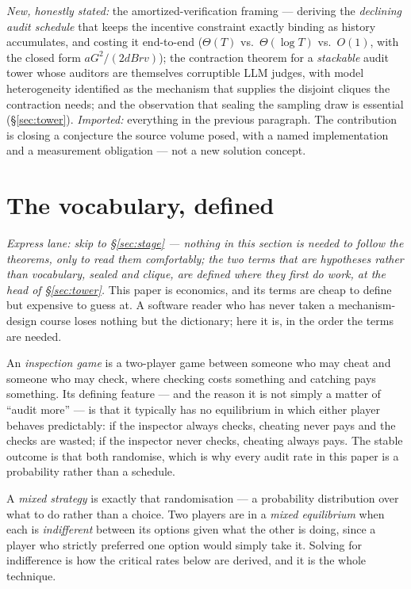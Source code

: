 \documentclass[11pt,a4paper]{article}
\begin{document}
\emph{New, honestly stated:} the amortized-verification framing --- deriving the \emph{declining audit schedule} that keeps the incentive constraint exactly binding as history accumulates, and costing it end-to-end ($\Theta(T)$ vs.\ $\Theta(\log T)$ vs.\ $O(1)$, with the closed form $aG^2/(2dBrv)$); the contraction theorem for a \emph{stackable} audit tower whose auditors are themselves corruptible LLM judges, with model heterogeneity identified as the mechanism that supplies the disjoint cliques the contraction needs; and the observation that sealing the sampling draw is essential (\S\ref{sec:tower}). \emph{Imported:} everything in the previous paragraph. The contribution is closing a conjecture the source volume posed, with a named implementation and a measurement obligation --- not a new solution concept.

\section{The vocabulary, defined}\label{sec:vocab}

\emph{Express lane: skip to \S\ref{sec:stage} --- nothing in this section is needed to follow the theorems, only to read them comfortably; the two terms that are hypotheses rather than vocabulary, \emph{sealed} and \emph{clique}, are defined where they first do work, at the head of \S\ref{sec:tower}.} This paper
is economics, and its terms are cheap to define but expensive to guess at. A software reader who has never taken
a mechanism-design course loses nothing but the dictionary; here it is, in the order the terms are needed.

An \emph{inspection game} is a two-player game between someone who may cheat and someone who may check, where checking
costs something and catching pays something. Its defining feature --- and the reason it is not simply a matter of ``audit
more'' --- is that it typically has no equilibrium in which either player behaves predictably: if the inspector always
checks, cheating never pays and the checks are wasted; if the inspector never checks, cheating always pays. The stable
outcome is that both randomise, which is why every audit rate in this paper is a probability rather than a schedule.

A \emph{mixed strategy} is exactly that randomisation --- a probability distribution over what to do rather than a choice.
Two players are in a \emph{mixed equilibrium} when each is \emph{indifferent} between its options given what the other is
doing, since a player who strictly preferred one option would simply take it. Solving for indifference is how the critical
rates below are derived, and it is the whole technique.
\end{document}
